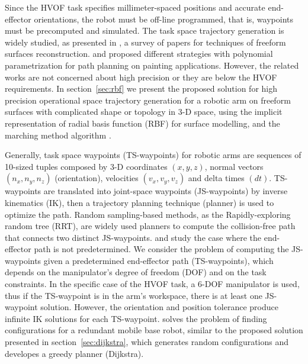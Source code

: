 \documentclass[letterpaper, 10 pt, conference]{ieeeconf}  %
\begin{document}
Since the HVOF task specifies millimeter-spaced positions and accurate
end-effector orientations, the robot must be off-line programmed, that is,
waypoints must be precomputed and simulated. The task space trajectory
generation is widely studied, as presented in \cite{c2}, a survey of papers for
techniques of freeform surfaces reconstruction. \cite{c3} and \cite{c4}
proposed different strategies with polynomial parametrization for path planning
on painting applications. However, the related works are not concerned
about high precision or they are below the HVOF requirements. In
section~\ref{sec:rbf} we present the proposed solution for high precision
operational space trajectory generation for a robotic arm on freeform surfaces
with complicated shape or topology in 3-D space, using the implicit representation of radial basis
function (RBF) \cite{c5} for surface modelling, and the marching method
algorithm \cite{c6}.

Generally, task space waypoints (TS-waypoints) for robotic arms are sequences of
10-sized tuples composed by 3-D coordinates $(x,y,z)$, normal vectors
$(n_x,n_y,n_z)$ (orientation), velocities $(v_x,v_y,v_z)$ and delta times
$(dt)$. TS-waypoints are translated into joint-space waypoints (JS-waypoints) by
inverse kinematics (IK), then a trajectory planning technique (planner) is used
to optimize the path. Random sampling-based methods, as the Rapidly-exploring
random tree (RRT), are widely used planners to compute the collision-free path
that connects two distinct JS-waypoints. \cite{c7} and \cite{c8} study the case
where the end-effector path is not predetermined. We consider the problem of
computing the JS-waypoints given a predetermined end-effector path
(TS-waypoints), which depends on the manipulator's degree of freedom (DOF) and on the task
constraints. In the specific case of the HVOF task, a 6-DOF manipulator is used,
thus if the TS-waypoint is in the arm's workspace, there is at least one
JS-waypoint solution. However, the orientation and position tolerance produce
infinite IK solutions for each TS-waypoint. \cite{c9} solves the problem of
finding configurations for a redundant mobile base robot, similar to the
proposed solution presented in section~\ref{sec:dijkstra}, which generates random
configurations and developes a greedy planner (Dijkstra).
\end{document}
